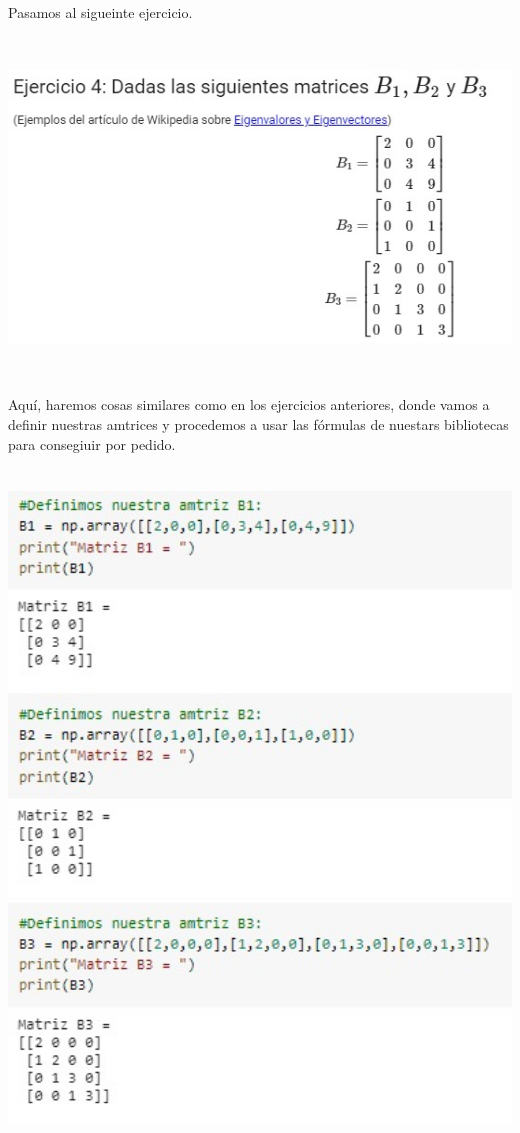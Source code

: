 \documentclass[12pt]{article}
\begin{document}
Pasamos al sigueinte ejercicio.

    \begin{center}
    	\includegraphics[height=9cm]{E4.jpeg}\\
    \end{center}
 Aquí, haremos cosas similares como en los ejercicios anteriores, donde vamos a definir nuestras amtrices y procedemos a usar las fórmulas de nuestars bibliotecas para consegiuir por pedido.
 
     \begin{center}
	\includegraphics[height=18cm]{E4.1.jpeg}\\
    \end{center}
    
\end{document}
